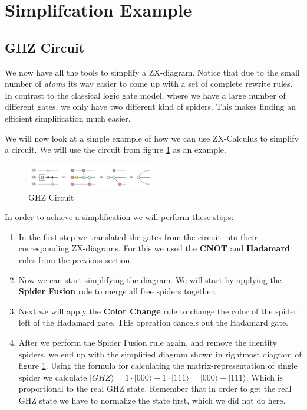 \section{Simplifcation Example}

\subsection{GHZ Circuit}

We now have all the tools to simplify a ZX-diagram. Notice that due to the small number of \textit{atoms} its way easier to come up with a set of complete rewrite rules. In contrast to the classical logic gate model, where we have a large number of different gates, we only have two different kind of spiders. This makes finding an efficient simplification much easier.

We will now look at a simple example of how we can use ZX-Calculus to simplify a circuit. We will use the circuit from figure \ref{fig:ghz} as an example.

\begin{figure}[h]
    \centering
    \includegraphics[width=0.5\textwidth]{images/ghz.png}
    \caption{GHZ Circuit}
    \label{fig:ghz}
\end{figure}

In order to achieve a simplification we will perform these steps:

\begin{enumerate}
    \item
          In the first step we translated the gates from the circuit into their corresponding ZX-diagrams. For this we used the \textbf{CNOT} and \textbf{Hadamard} rules from the previous section.
    \item
          Now we can start simplifying the diagram. We will start by applying the \textbf{Spider Fusion} rule to merge all free spiders together.
    \item
          Next we will apply the \textbf{Color Change} rule to change the color of the spider left of the Hadamard gate. This operation cancels out the Hadamard gate.
    \item
          After we perform the Spider Fusion rule again, and remove the identity spiders, we end up with the simplified diagram shown in rightmost diagram of figure \ref{fig:ghz}. Using the formula for calculating the matrix-representation of single spider we calculate $|GHZ\rangle = 1\cdot |000\rangle + 1\cdot |111\rangle = |000\rangle + |111\rangle$. Which is proportional to the real GHZ state. Remember that in order to get the real GHZ state we have to normalize the state first, which we did not do here.
\end{enumerate}

